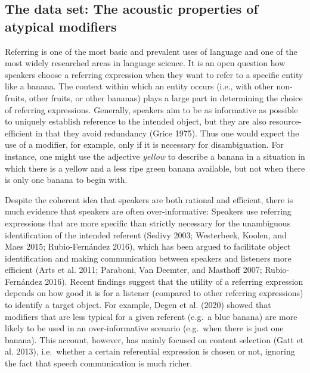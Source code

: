 \documentclass[
  12pt,
]{article}
\begin{document}
\hypertarget{s:dataset}{%
\subsection{The data set: The acoustic properties of atypical modifiers}\label{s:dataset}}

Referring is one of the most basic and prevalent uses of language and one of the most widely researched areas in language science.
It is an open question how speakers choose a referring expression when they want to refer to a specific entity like a banana.
The context within which an entity occurs (i.e., with other non-fruits, other fruits, or other bananas) plays a large part in determining the choice of referring expressions.
Generally, speakers aim to be as informative as possible to uniquely establish reference to the intended object, but they are also resource-efficient in that they avoid redundancy (Grice 1975).
Thus one would expect the use of a modifier, for example, only if it is necessary for disambiguation.
For instance, one might use the adjective \emph{yellow} to describe a banana in a situation in which there is a yellow and a less ripe green banana available, but not when there is only one banana to begin with.

Despite the coherent idea that speakers are both rational and efficient, there is much evidence that speakers are often over-informative: Speakers use referring expressions that are more specific than strictly necessary for the unambiguous identification of the intended referent (Sedivy 2003; Westerbeek, Koolen, and Maes 2015; Rubio-Fernández 2016), which has been argued to facilitate object identification and making communication between speakers and listeners more efficient (Arts et al. 2011; Paraboni, Van Deemter, and Masthoff 2007; Rubio-Fernández 2016).
Recent findings suggest that the utility of a referring expression depends on how good it is for a listener (compared to other referring expressions) to identify a target object.
For example, Degen et al. (2020) showed that modifiers that are less typical for a given referent (e.g.~a blue banana) are more likely to be used in an over-informative scenario (e.g.~when there is just one banana).
This account, however, has mainly focused on content selection (Gatt et al. 2013), i.e.~whether a certain referential expression is chosen or not, ignoring the fact that speech communication is much richer.
\end{document}
